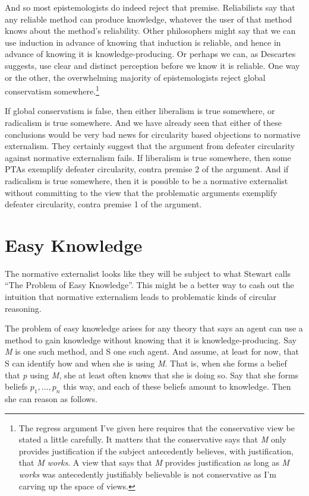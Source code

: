 And so most epistemologists do indeed reject that premise. Reliabilists say that any reliable method can produce knowledge, whatever the user of that method knows about the method's reliability. Other philosophers might say that we can use induction in advance of knowing that induction is reliable, and hence in advance of knowing it is knowledge-producing. Or perhaps we can, as Descartes suggests, use clear and distinct perception before we know it is reliable. One way or the other, the overwhelming majority of epistemologists reject global conservatism somewhere.\footnote{The regress argument I've given here requires that the conservative view be stated a little carefully. It matters that the conservative says that \emph{M} only provides justification if the subject antecedently believes, with justification, that \emph{M works}. A view that says that \emph{M} provides justification as long as \emph{M works} was antecedently justifiably believable is not conservative as I'm carving up the space of views.}

If global conservatism is false, then either liberalism is true somewhere, or radicalism is true somewhere. And we have already seen that either of these conclusions would be very bad news for circularity based objections to normative externalism. They certainly suggest that the argument from defeater circularity against normative externalism fails. If liberalism is true somewhere, then some PTAs exemplify defeater circularity, contra premise 2 of the argument. And if radicalism is true somewhere, then it is possible to be a normative externalist without committing to the view that the problematic arguments exemplify defeater circularity, contra premise 1 of the argument.

\section{Easy Knowledge}
\label{easyknowledge}

The normative externalist looks like they will be subject to what Stewart \citet{Cohen2002, Cohen2005} calls ``The Problem of Easy Knowledge''. This might be a better way to cash out the intuition that normative externalism leads to problematic kinds of circular reasoning.

The problem of easy knowledge arises for any theory that says an agent can use a method to gain knowledge without knowing that it is knowledge-producing. Say \emph{M} is one such method, and S one such agent. And assume, at least for now, that S can identify how and when she is using \emph{M}. That is, when she forms a belief that \emph{p} using \emph{M}, she at least often knows that she is doing so. Say that she forms beliefs $p_1, \dots, p_n$ this way, and each of these beliefs amount to knowledge. Then she can reason as follows.

